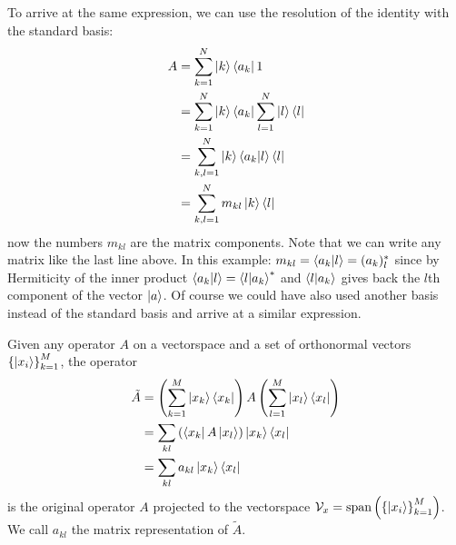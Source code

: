 To arrive at the same expression, we can use the resolution of the identity with the standard basis:
\begin{align}
    A &= \sum_{k=1}^N \ket{k}\bra{a_k} 1 \\
    &= \sum_{k=1}^N \ket{k}\bra{a_k} \sum_{l=1}^N\ket{l}\bra{l} \\
    &= \sum_{k,l=1}^N \ket{k} \bra{a_k} \ket{l}\bra{l}\\
    &= \sum_{k,l=1}^N m_{kl} \ket{k}\bra{l}
\end{align}
now the numbers $m_{kl}$ are the matrix components.
Note that we can write any matrix like the last line above. 
In this example: $m_{kl} = \bra{a_k}\ket{l} = (a_k)_l^\ast$ since by Hermiticity of the inner product $\bra{a_k}\ket{l} = \bra{l}\ket{a_k}^*$ and $\bra{l}\ket{a_k}$ gives back the $l$th component of the vector $\ket{a}$.
Of course we could have also used another basis instead of the standard basis and arrive at a similar expression.

\begin{def*}
    Given any operator $A$ on a vectorspace and a set of orthonormal vectors $\left\{\ket{x_i}\right\}_{k=1}^M$, the operator
    \begin{align*}
        \tilde{A} &= \left(\sum_{k=1}^M \ket{x_k}\bra{x_k}\right) A \left(\sum_{l=1}^M \ket{x_l}\bra{x_l}\right) \\
        &= \sum_{kl} \left(\bra{x_k}A\ket{x_l}\right) \ket{x_k} \bra{x_l}\\
        &= \sum_{kl} a_{kl} \ket{x_k} \bra{x_l}
    \end{align*}
    is the original operator $A$ projected to the vectorspace $\mathcal{V}_x= \text{span} \left(\left\{\ket{x_i}\right\}_{k=1}^M\right)$. We call $a_{kl}$ the matrix representation of $\tilde{A}$.
\end{def*}

